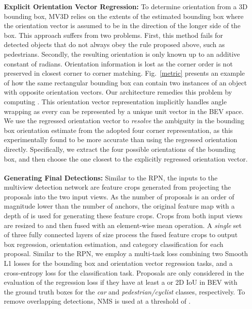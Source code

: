 \documentclass[letterpaper, 10 pt, conference]{ieeeconf}
\newcommand{\fig}[1]{Fig.~\ref{#1}}
\begin{document}
\noindent\textbf{Explicit Orientation Vector Regression:} To determine orientation from a 3D bounding box, MV3D \cite{cvpr17chen} relies on the extents of the estimated bounding box where the orientation vector is assumed to be in the direction of the longer side of the box. This approach suffers from two problems. First, this method fails for detected objects that do not always obey the rule proposed above, such as pedestrians. Secondly, the resulting orientation is only known up to an additive constant of  radians. Orientation information is lost as the corner order is not preserved in closest corner to corner matching. \fig{metric} presents an example of how the same rectangular bounding box can contain two instances of an object with opposite orientation vectors. Our architecture remedies this problem by computing . This orientation vector representation implicitly handles angle wrapping as every  can be represented by a unique unit vector in the BEV space. We use the regressed orientation vector to \textit{resolve} the ambiguity in the bounding box orientation estimate from the adopted four corner representation, as this experimentally found to be more accurate than using the regressed orientation directly. Specifically, we extract the four possible orientations of the bounding box, and then choose the one closest to the explicitly regressed orientation vector.
\\
\\
\textbf{Generating Final Detections:}
Similar to the RPN, the inputs to the multiview detection network are feature crops generated from projecting the proposals into the two input views. As the number of proposals is an order of magnitude lower than the number of anchors, the original feature map with a depth of  is used for generating these feature crops. Crops from both input views are resized to  and then fused with an element-wise mean operation. A \textit{single} set of three fully connected layers of size  process the fused feature crops to output box regression, orientation estimation, and category classification for each proposal. Similar to the RPN, we employ a multi-task loss combining two Smooth L1 losses for the bounding box and orientation vector regression tasks, and a cross-entropy loss for the classification task. Proposals are only considered in the evaluation of the regression loss if they have at least a  or  2D IoU in BEV with the ground truth boxes for the \textit{car} and \textit{pedestrian/cyclist} classes, respectively. To remove overlapping detections, NMS is used at a threshold of .
\end{document}
